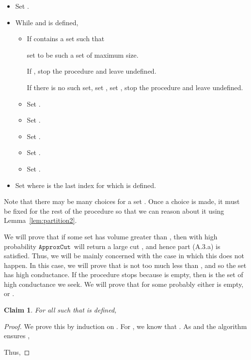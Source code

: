 \documentclass[11pt]{article}
\newtheorem{claim}[theorem]{Claim}
\newcommand{\approxcut}{\ensuremath{\mathtt{ApproxCut}}}
\begin{document}
\begin{itemize}

\item [1.] Set .

\item [2.] While  and  is defined,

\begin{itemize}

\item [a.] If  contains a set 
 such that

set  to be such a set of maximum size.

If , 
  stop the procedure and leave  undefined.

If there is no such set, set , set ,
  stop the procedure and leave  undefined.



\item [b.] Set .
\item [c.] Set .

\item [d.] Set .

\item [e.] Set .

\item [f.] Set .



\end{itemize}

\item [3.] Set  where  is the last index for which  is defined.
\end{itemize}

Note that there may be many choices for a set .
Once a choice is made, it must be fixed for the rest of the procedure so that
  we can reason about it using Lemma~\ref{lem:partition2}.

We will prove that if some set  has volume
  greater than , then with high probability \approxcut \
  will return a large cut , and hence part (A.3.a) is satisfied.
Thus, we will be mainly concerned with the case in which this does not happen.
In this case, we will prove that  is not too much less than ,
and so the set  has high conductance.
If the procedure stops because  is empty, then 
  is the set of high conductance we seek.
We will prove that for some  probably either  is empty, 
   or .

\begin{claim}\label{clm:VinsideW}
For all  such that  is defined,

\end{claim}
\begin{proof}
We prove this by induction on .
For , we know that .
As  and the algorithm ensures ,

Thus,

\end{proof}
\end{document}
